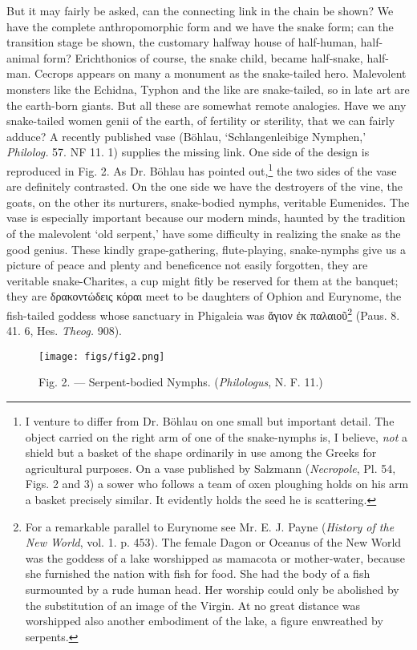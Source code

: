 \documentclass[a4paper, 11pt, oneside, polutonikogreek, english]{article}
\begin{document}
But it may fairly be asked, can the connecting link in the chain be shown? We have the complete anthropomorphic form and we have the snake form; can the transition stage be shown, the customary halfway house of half-human, half-animal form? Erichthonios of course, the snake child, became half-snake, half-man. Cecrops appears on many a monument as the snake-tailed hero. Malevolent monsters like the Echidna, Typhon and the like are snake-tailed, so in late art are the earth-born giants. But all these are somewhat remote analogies. Have we any snake-tailed women genii of the earth, of fertility or sterility, that we can fairly adduce? A recently published vase (Böhlau, `Schlangenleibige Nymphen,' \emph{Philolog.} 57. NF 11. 1) supplies the missing link. One side of the design is reproduced in Fig. 2. As Dr. Böhlau has pointed out,\footnote{I venture to differ from Dr. Böhlau on one small but important detail. The object carried on the right arm of one of the snake-nymphs is, I believe, \emph{not} a shield but a basket of the shape ordinarily in use among the Greeks for agricultural purposes. On a vase published by Salzmann (\emph{Necropole}, Pl. 54, Figs. 2 and 3) a sower who follows a team of oxen ploughing holds on his arm a basket precisely similar. It evidently holds the seed he is scattering.} the two sides of the vase are definitely contrasted. On the one side we have the destroyers of the vine, the goats, on the other its nurturers, snake-bodied nymphs, veritable Eumenides. The vase is especially important because our modern minds, haunted by the tradition of the malevolent `old serpent,' have some difficulty in realizing the snake as the good genius. These kindly grape-gathering, flute-playing, snake-nymphs give us a picture of peace and plenty and beneficence not easily forgotten, they are veritable snake-Charites, a cup might fitly be reserved for them at the banquet; they are δρακοντώδεις κόραι meet to be daughters of Ophion and Eurynome, the fish-tailed goddess whose sanctuary in Phigaleia was ἅγιον ἐκ παλαιοῦ\footnote{For a remarkable parallel to Eurynome see Mr. E. J. Payne (\emph{History of the New World}, vol. 1. p. 453). The female Dagon or Oceanus of the New World was the goddess of a lake worshipped as mamacota or mother-water, because she furnished the nation with fish for food. She had the body of a fish surmounted by a rude human head. Her worship could only be abolished by the substitution of an image of the Virgin. At no great distance was worshipped also another embodiment of the lake, a figure enwreathed by serpents.} (Paus. 8. 41. 6, Hes. \emph{Theog.} 908).
\begin{figure}[H]
\centering
\texttt{[image: figs/fig2.png]}
\caption{\Fontauri Fig. 2. --- Serpent-bodied Nymphs. (\emph{Philologus}, N. F. 11.)}
\end{figure}
\end{document}
